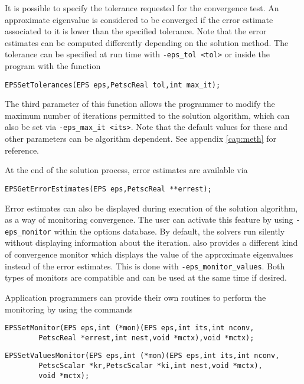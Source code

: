 	It is possible to specify the tolerance requested for the convergence test. An approximate eigenvalue is considered to be converged if the error estimate associated to it is lower than the specified tolerance. Note that the error estimates can be computed differently depending on the solution method. The tolerance can be specified at run time with \Verb!-eps_tol <tol>! or inside the program with the function
	\begin{Verbatim}[fontsize=\small]
	EPSSetTolerances(EPS eps,PetscReal tol,int max_it);
	\end{Verbatim}
	The third parameter of this function allows the programmer to modify the maximum number of iterations permitted to the solution algorithm, which can also be set via \Verb!-eps_max_it <its>!. Note that the default values for these and other parameters can be algorithm dependent. See appendix \ref{cap:meth} for reference.

	At the end of the solution process, error estimates are available via
	\begin{Verbatim}[fontsize=\small]
	EPSGetErrorEstimates(EPS eps,PetscReal **errest);
	\end{Verbatim}

	Error estimates can also be displayed during execution of the solution algorithm, as a way of monitoring convergence. The user can activate this feature by using \Verb!-eps_monitor! within the options database. By default, the solvers run silently without displaying information about the iteration. \slepc also provides a different kind of convergence monitor which displays the value of the approximate eigenvalues instead of the error estimates. This is done with \Verb!-eps_monitor_values!. Both types of monitors are compatible and can be used at the same time if desired.

	Application programmers can provide their own routines to perform the monitoring by using the commands
	 
	\begin{Verbatim}[fontsize=\small]
	EPSSetMonitor(EPS eps,int (*mon)(EPS eps,int its,int nconv,
		PetscReal *errest,int nest,void *mctx),void *mctx);
	\end{Verbatim}
	\begin{Verbatim}[fontsize=\small]
	EPSSetValuesMonitor(EPS eps,int (*mon)(EPS eps,int its,int nconv,
		PetscScalar *kr,PetscScalar *ki,int nest,void *mctx),
		void *mctx);
	\end{Verbatim}

